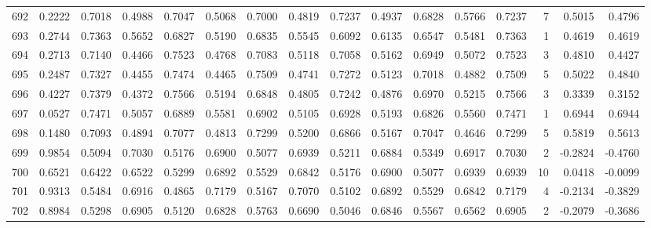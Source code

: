 \begin{tabular}{lrrrrrrrrrrrrrrr}
692 &      0.2222 &  0.7018 &  0.4988 &  0.7047 &  0.5068 &  0.7000 &  0.4819 &  0.7237 &  0.4937 &  0.6828 &   0.5766 &     0.7237 &      7 &                    0.5015 &                     0.4796 \\
693 &      0.2744 &  0.7363 &  0.5652 &  0.6827 &  0.5190 &  0.6835 &  0.5545 &  0.6092 &  0.6135 &  0.6547 &   0.5481 &     0.7363 &      1 &                    0.4619 &                     0.4619 \\
694 &      0.2713 &  0.7140 &  0.4466 &  0.7523 &  0.4768 &  0.7083 &  0.5118 &  0.7058 &  0.5162 &  0.6949 &   0.5072 &     0.7523 &      3 &                    0.4810 &                     0.4427 \\
695 &      0.2487 &  0.7327 &  0.4455 &  0.7474 &  0.4465 &  0.7509 &  0.4741 &  0.7272 &  0.5123 &  0.7018 &   0.4882 &     0.7509 &      5 &                    0.5022 &                     0.4840 \\
696 &      0.4227 &  0.7379 &  0.4372 &  0.7566 &  0.5194 &  0.6848 &  0.4805 &  0.7242 &  0.4876 &  0.6970 &   0.5215 &     0.7566 &      3 &                    0.3339 &                     0.3152 \\
697 &      0.0527 &  0.7471 &  0.5057 &  0.6889 &  0.5581 &  0.6902 &  0.5105 &  0.6928 &  0.5193 &  0.6826 &   0.5560 &     0.7471 &      1 &                    0.6944 &                     0.6944 \\
698 &      0.1480 &  0.7093 &  0.4894 &  0.7077 &  0.4813 &  0.7299 &  0.5200 &  0.6866 &  0.5167 &  0.7047 &   0.4646 &     0.7299 &      5 &                    0.5819 &                     0.5613 \\
699 &      0.9854 &  0.5094 &  0.7030 &  0.5176 &  0.6900 &  0.5077 &  0.6939 &  0.5211 &  0.6884 &  0.5349 &   0.6917 &     0.7030 &      2 &                   -0.2824 &                    -0.4760 \\
700 &      0.6521 &  0.6422 &  0.6522 &  0.5299 &  0.6892 &  0.5529 &  0.6842 &  0.5176 &  0.6900 &  0.5077 &   0.6939 &     0.6939 &     10 &                    0.0418 &                    -0.0099 \\
701 &      0.9313 &  0.5484 &  0.6916 &  0.4865 &  0.7179 &  0.5167 &  0.7070 &  0.5102 &  0.6892 &  0.5529 &   0.6842 &     0.7179 &      4 &                   -0.2134 &                    -0.3829 \\
702 &      0.8984 &  0.5298 &  0.6905 &  0.5120 &  0.6828 &  0.5763 &  0.6690 &  0.5046 &  0.6846 &  0.5567 &   0.6562 &     0.6905 &      2 &                   -0.2079 &                    -0.3686 \\

\end{tabular}
